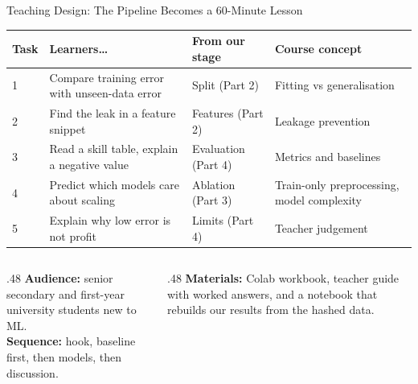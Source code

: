 \documentclass[aspectratio=169,11pt]{beamer}
\newcommand{\currentspeaker}{}
\newcommand{\speaker}[1]{\gdef\currentspeaker{#1}}
\begin{document}
\begin{frame}{Teaching Design: The Pipeline Becomes a 60-Minute Lesson}
  \speaker{Lau Pak Hei}
  \centering\scriptsize
  \renewcommand{\arraystretch}{1.25}
  \begin{tabular}{@{}l>{\raggedright\arraybackslash}p{.27\linewidth}>{\raggedright\arraybackslash}p{.22\linewidth}>{\raggedright\arraybackslash}p{.24\linewidth}@{}}
    \toprule
    \textbf{Task} & \textbf{Learners\ldots} & \textbf{From our stage} & \textbf{Course concept} \\
    \midrule
    1 & Compare training error with unseen-data error & Split (Part 2) & Fitting vs generalisation \\
    2 & Find the leak in a feature snippet & Features (Part 2) & Leakage prevention \\
    3 & Read a skill table, explain a negative value & Evaluation (Part 4) & Metrics and baselines \\
    4 & Predict which models care about scaling & Ablation (Part 3) & Train-only preprocessing, model complexity \\
    5 & Explain why low error is not profit & Limits (Part 4) & Teacher judgement \\
    \bottomrule
  \end{tabular}
  \par\vspace{3mm}
  \begin{columns}[T,onlytextwidth]
    \begin{column}{.48\textwidth}
      \footnotesize
      \textbf{Audience:} senior secondary and first-year university students new to ML.\\
      \textbf{Sequence:} hook, baseline first, then models, then discussion.
    \end{column}
    \begin{column}{.48\textwidth}
      \footnotesize
      \textbf{Materials:} Colab workbook, teacher guide with worked answers, and a notebook that
      rebuilds our results from the hashed data.
    \end{column}
  \end{columns}
\end{frame}
\end{document}
